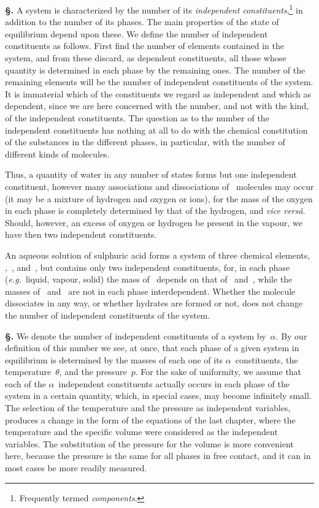\documentclass[12pt]{book}[2005/09/16]
\newcommand{\Section}[1]{
  \medskip\par\textbf{§\;#1}
  \label{section:#1}
}
\newcommand{\PageSep}[1]{\ignorespaces}
\newcommand{\eg}{\emph{e.g.}}
\begin{document}
\Section{198.} A system is characterized by the number of its
\emph{independent constituents},\footnote
  {Frequently termed \emph{components}.}
in addition to the number of its
phases. The main properties of the state of equilibrium
depend upon these. We define the number of independent
constituents as follows. First find the number of elements
contained in the system, and from these discard, as dependent
constituents, all those whose quantity is determined in
each phase by the remaining ones. The number of the
remaining elements will be the number of independent
constituents of the system. It is immaterial which of the
\PageSep{174}
constituents we regard as independent and which as dependent,
since we are here concerned with the number, and not
with the kind, of the independent constituents. The question
as to the number of the independent constituents has
nothing at all to do with the chemical constitution of the
substances in the different phases, in particular, with the
number of different kinds of molecules.

Thus, a quantity of water in any number of states forms
but one independent constituent, however many associations
and dissociations of ~molecules may occur (it may be
a mixture of hydrogen and oxygen or ions), for the mass of
the oxygen in each phase is completely determined by that
of the hydrogen, and \textit{vice versâ}. Should, however, an excess
of oxygen or hydrogen be present in the vapour, we have
then two independent constituents.

An aqueous solution of sulphuric acid forms a system of
three chemical elements, ,~, and~, but contains only two
independent constituents, for, in each phase (\eg\ liquid,
vapour, solid) the mass of~ depends on that of ~and~,
while the masses of ~and~ are not in each phase interdependent.
Whether the molecule  dissociates in
any way, or whether hydrates are formed or not, does not
change the number of independent constituents of the
system.

\Section{199.} We denote the number of independent constituents
of a system by~$\alpha$. By our definition of this number we see,
at once, that each phase of a given system in equilibrium is
determined by the masses of each one of its $\alpha$~constituents,
the temperature~$\theta$, and the pressure~$p$. For the sake of
uniformity, we assume that each of the $\alpha$~independent constituents
actually occurs in each phase of the system in a
certain quantity, which, in special cases, may become
infinitely small. The selection of the temperature and the
pressure as independent variables, produces a change in the
form of the equations of the last chapter, where the temperature
and the specific volume were considered as the
independent variables. The substitution of the pressure
\PageSep{175}
for the volume is more convenient here, because the pressure
is the same for all phases in free contact, and it can in most
cases be more readily measured.
\end{document}

